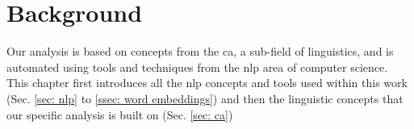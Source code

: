 \chapter{Background \label{cpt: background}}

Our analysis is based on concepts from the \gls{ca}, a sub-field of linguistics, and is automated using tools and techniques from the \gls{nlp} area of computer science. This chapter first introduces all the \gls{nlp} concepts and tools used within this work (Sec. \ref{sec: nlp} to \ref{ssec: word embeddings}) and then the linguistic concepts that our specific analysis is built on (Sec. \ref{sec: ca})



 
 
 
 


\glsresetall
